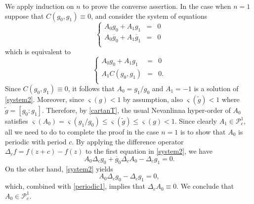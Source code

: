 \documentclass{amsart}
\theoremstyle{definition}
\numberwithin{equation}{section}
\numberwithin{theorem}{section}
\begin{document}
We apply induction on $n$ to prove the converse assertion. In the case when $n=1$ suppose that $C(g_0,g_1)\equiv0$, and consider the system of equations
	\begin{equation}\label{system2}
	\left\{\begin{array}{lcl}
	A_0g_0+A_1g_1 &=&0\\
	A_0\overline{g}_0+A_1 \overline{g}_1&=&0\\
	\end{array}\right.
	\end{equation}
which is equivalent to
	\begin{equation*}
	\left\{\begin{array}{lcl}
	A_0g_0+A_1g_1 &=&0\\
	A_1 C(g_0,g_1)&=&0.\\
	\end{array}\right.
	\end{equation*}
Since $C(g_0,g_1)\equiv0$, it follows that $A_0=g_1/g_0$ and $A_1=-1$ is a solution of \eqref{system2}. Moreover, since $\varsigma(g)<1$ by assumption, also $\varsigma(\tilde g)<1$ where $\tilde g =[g_0:g_1]$. Therefore, by \eqref{cartanT}, the usual Nevanlinna hyper-order of $A_0$ satisfies $\varsigma(A_0)=\varsigma(g_1/g_0)\leq \varsigma(\tilde g)\leq \varsigma(g)<1$. Since clearly $A_1\in\mathcal{P}^1_c$, all we need to do to complete the proof in the case $n=1$ is to show that $A_0$ is periodic with period $c$. By applying the difference operator $\Delta_c f=f(z+c)-f(z)$ to the first equation in \eqref{system2}, we have
	\begin{equation}\label{periodic1}
	A_0\Delta_c g_0+\overline g_0 \Delta_c A_0-\Delta_c g_1=0.
	\end{equation}
On the other hand, \eqref{system2} yields
	\begin{equation*}
	A_0\Delta_c g_0-\Delta_c g_1=0,
	\end{equation*}
which, combined with \eqref{periodic1}, implies that $\Delta_c A_0\equiv0$. We conclude that $A_0\in\mathcal{P}^1_c$.
\end{document}
